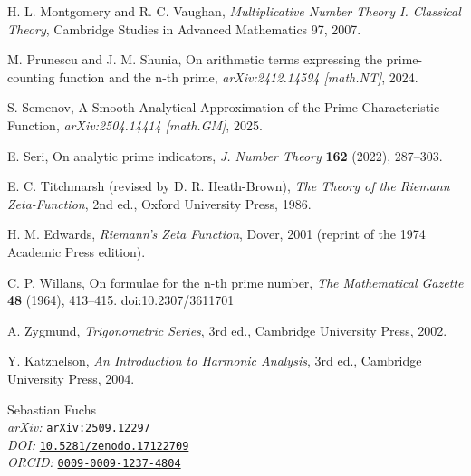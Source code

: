 \documentclass[11pt,a4paper]{amsart}
\theoremstyle{plain}
\theoremstyle{definition}
\theoremstyle{remark}
\begin{document}
\begin{thebibliography}{99}
H. L. Montgomery and R. C. Vaughan, \emph{Multiplicative Number Theory I. Classical Theory}, Cambridge Studies in Advanced Mathematics 97, 2007.

M. Prunescu and J. M. Shunia, On arithmetic terms expressing the prime-counting function and the n-th prime, \emph{arXiv:2412.14594 [math.NT]}, 2024.

S. Semenov, A Smooth Analytical Approximation of the Prime Characteristic Function, \emph{arXiv:2504.14414 [math.GM]}, 2025.

E. Seri, On analytic prime indicators, \emph{J. Number Theory} \textbf{162} (2022), 287--303.

E. C. Titchmarsh (revised by D. R. Heath-Brown), \emph{The Theory of the Riemann Zeta-Function}, 2nd ed., Oxford University Press, 1986.

H. M. Edwards, \emph{Riemann's Zeta Function}, Dover, 2001 (reprint of the 1974 Academic Press edition).

C. P. Willans, On formulae for the n-th prime number,
\emph{The Mathematical Gazette} \textbf{48} (1964), 413--415.
doi:10.2307/3611701

A. Zygmund, \emph{Trigonometric Series}, 3rd ed., Cambridge University Press, 2002.

Y. Katznelson, \emph{An Introduction to Harmonic Analysis}, 3rd ed., Cambridge University Press, 2004.


\end{thebibliography}

\vfill
\par\noindent
\small
Sebastian Fuchs \\[1ex]
\textit{arXiv:} \texttt{\href{https://arxiv.org/abs/2509.12297}{arXiv:2509.12297}} \\
\textit{DOI:} \texttt{\href{https://doi.org/10.5281/zenodo.17122709}{10.5281/zenodo.17122709}} \\ 
\textit{ORCID:} \texttt{\href{https://orcid.org/0009-0009-1237-4804}{0009-0009-1237-4804}} \\
\end{document}
